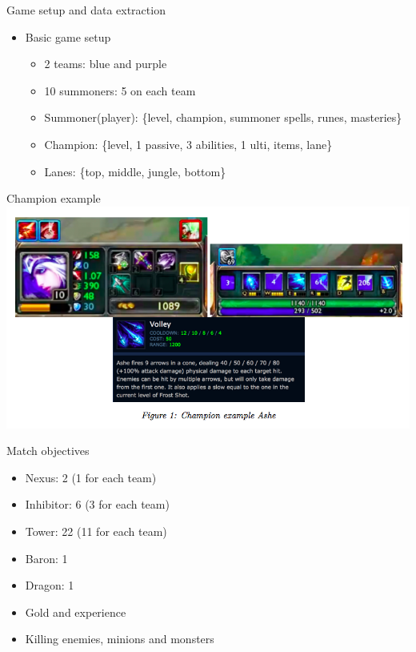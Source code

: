 \begin{frame}{Game setup and data extraction}
\begin{itemize}
\item Basic game setup
\begin{itemize}
\item 2 teams: blue and purple
\item 10 summoners: 5 on each team
\item Summoner(player): \{level, champion, summoner spells, runes, masteries\}
\item Champion: \{level, 1 passive, 3 abilities, 1 ulti, items, lane\}
\item Lanes: \{top, middle, jungle, bottom\}
\end{itemize}
\end{itemize}
\end{frame}
\begin{frame}{Champion example}
\includegraphics[scale=0.4]{leagueoflegends/ashe}
\end{frame}
\begin{frame}{Match objectives}
\begin{itemize}
\item Nexus: 2 (1 for each team)
\item Inhibitor: 6 (3 for each team)
\item Tower: 22 (11 for each team)
\item Baron: 1
\item Dragon: 1 
\item Gold and experience
\item Killing enemies, minions and monsters
\end{itemize}
\end{frame}
